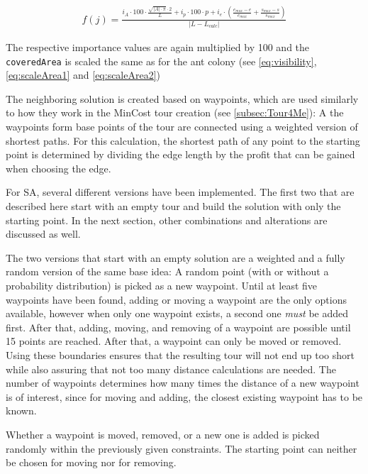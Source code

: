 \begin{equation}
	\label{eq:qualitySA}
	\begin{split}
		f(j) = \frac{i_A \cdot 100 \cdot \frac{\sqrt{|A|\cdot \pi} \cdot 2 }{L} 
		+  i_p \cdot 100 \cdot p
		+ i_e \cdot \left(\frac{e_{max} - e}{e_{max}} + \frac{s_{max} - s}{s_{max}}\right)}{\left| L - L_{calc} \right|}
	\end{split}
\end{equation}

The respective importance values are again multiplied by 100 and the  \texttt{coveredArea} is scaled the same as for the ant colony (see \ref{eq:visibility}, \ref{eq:scaleArea1} and \ref{eq:scaleArea2})

The neighboring solution is created based on waypoints, which are used similarly to how they work in the MinCost tour creation (see \ref{subsec:Tour4Me}):
A the waypoints form base points of the tour are connected using a weighted version of shortest paths. 
For this calculation, the shortest path of any point to the starting point is determined by dividing the edge length by the profit that can be gained when choosing the edge. 

For SA, several different versions have been implemented.
The first two that are described here start with an empty tour and build the solution with only the starting point.
In the next section, other combinations and alterations are discussed as well.

The two versions that start with an empty solution are a weighted and a fully random version of the same base idea:
A random point (with or without a probability distribution) is picked as a new waypoint. 
Until at least five waypoints have been found, adding or moving a waypoint are the only options available, however when only one waypoint exists, a second one \textit{must} be added first.
After that, adding, moving, and removing of a waypoint are possible until 15 points are reached.
After that, a waypoint can only be moved or removed.
Using these boundaries ensures that the resulting tour will not end up too short while also assuring that not too many distance calculations are needed.
The number of waypoints determines how many times the distance of a new waypoint is of interest, since for moving and adding, the closest existing waypoint has to be known.


Whether a waypoint is moved, removed, or a new one is added is picked randomly within the previously given constraints.
The starting point can neither be chosen for moving nor for removing.

